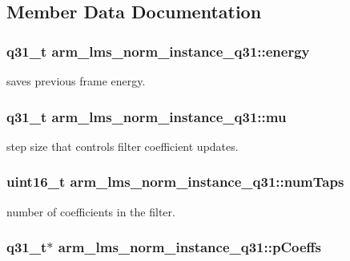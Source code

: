 \subsection{Member Data Documentation}
\hypertarget{structarm__lms__norm__instance__q31_a3c0ae42869afec8555dc8e3a7ef9b386}{
\subsubsection[{energy}]{\setlength{\rightskip}{0pt plus 5cm}q31\-\_\-t arm\-\_\-lms\-\_\-norm\-\_\-instance\-\_\-q31\-::energy}}\label{structarm__lms__norm__instance__q31_a3c0ae42869afec8555dc8e3a7ef9b386}
saves previous frame energy. \hypertarget{structarm__lms__norm__instance__q31_ad3dd2a2406e02fdaa7782ba6c3940a64}{
\subsubsection[{mu}]{\setlength{\rightskip}{0pt plus 5cm}q31\-\_\-t arm\-\_\-lms\-\_\-norm\-\_\-instance\-\_\-q31\-::mu}}\label{structarm__lms__norm__instance__q31_ad3dd2a2406e02fdaa7782ba6c3940a64}
step size that controls filter coefficient updates. \hypertarget{structarm__lms__norm__instance__q31_a28e4c085af69c9c3e2e95dacf8004c3e}{
\subsubsection[{num\-Taps}]{\setlength{\rightskip}{0pt plus 5cm}uint16\-\_\-t arm\-\_\-lms\-\_\-norm\-\_\-instance\-\_\-q31\-::num\-Taps}}\label{structarm__lms__norm__instance__q31_a28e4c085af69c9c3e2e95dacf8004c3e}
number of coefficients in the filter. \hypertarget{structarm__lms__norm__instance__q31_a57a64c1ff102d033c1bd05043f1d9955}{
\subsubsection[{p\-Coeffs}]{\setlength{\rightskip}{0pt plus 5cm}q31\-\_\-t$\ast$ arm\-\_\-lms\-\_\-norm\-\_\-instance\-\_\-q31\-::p\-Coeffs}}\label{structarm__lms__norm__instance__q31_a57a64c1ff102d033c1bd05043f1d9955}
